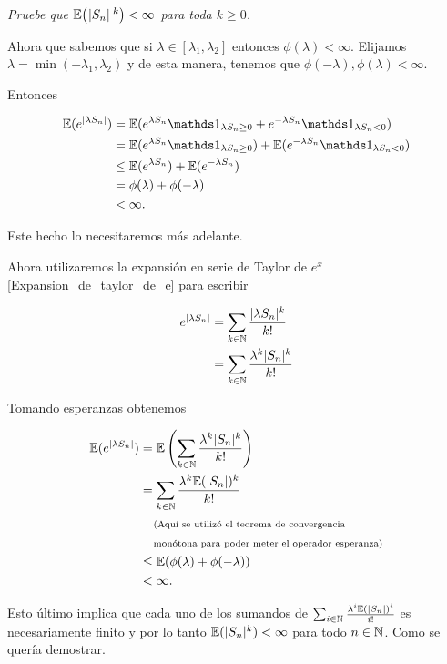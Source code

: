 \emph{
	Pruebe que $\mathbb{E}\! \left( \hspace{.25mm}\left|S_n\right|\hspace{.25mm}^k \right)<\infty$ para toda $k\geq 0$.
}

\afterstatement\pn

Ahora que sabemos que si $\lambda \in [\lambda_1, \lambda_2]$ entonces $\phi(\lambda) < \infty$. Elijamos 
$\lambda = \min(-\lambda_1, \lambda_2)$ y de esta manera, tenemos que $\phi(-\lambda), \phi(\lambda) < \infty$.\pn

Entonces

\begin{align}
    \E(e^{|\lambda S_n|})   &=      \E(e^{\lambda S_n} \indic_{\lambda S_n \geq 0} + e^{-\lambda S_n} \indic_{\lambda S_n < 0} )        \\ 
                            &=      \E(e^{\lambda S_n} \indic_{\lambda S_n \geq 0}) + \E(e^{-\lambda S_n} \indic_{\lambda S_n < 0})     \\
                            &\leq   \E(e^{\lambda S_n} ) + \E(e^{-\lambda S_n})                                                         \\
                            &=      \phi(\lambda) + \phi(-\lambda)                                                                      \\
                            &<      \infty.                                                  
\end{align}\pn

Este hecho lo necesitaremos más adelante.\pn

Ahora utilizaremos la expansión en serie de Taylor de $e^x$ \eqref{Expansion_de_taylor_de_e} para escribir

\begin{align}
    e^{|\lambda S_n|}   &=  \sum_{k \in \mathbb{N}} \frac{|\lambda S_n|^k}{k!}      \\
                        &=  \sum_{k \in \mathbb{N}} \frac{\lambda^k |S_n|^k}{k!}    
\end{align}\pn

Tomando esperanzas obtenemos

\begin{align}
    \mathbb{E}(e^{|\lambda S_n|})   &=      \mathbb{E}\left(\sum_{k \in \mathbb{N}} \frac{\lambda^k |S_n|^k}{k!}\right)                                         \\
                            &=      \sum_{k \in \mathbb{N}} \frac{\lambda^k \mathbb{E}(|S_n|)^k}{k!}                                                    \\
                            &\;\;\;\;\mbox{{\scriptsize(Aquí se utilizó el teorema de convergencia}}                                                      \\
                            &\;\;\;\;\mbox{{\scriptsize monótona para poder meter el operador esperanza)}}                                                 \\
                            &\leq   \mathbb{E}(\phi(\lambda) + \phi(-\lambda))                                                                  \\
                            &<      \infty.
\end{align}\pn

Esto último implica que cada uno de los sumandos de $\sum_{i \in \mathbb{N}} \frac{\lambda^i \mathbb{E}(|S_n|)^i}{i!}$ es necesariamente finito y por lo tanto
$\mathbb{E}(|S_n|^k) < \infty$ para todo $n \in \mathbb{N}$. Como se quería demostrar.